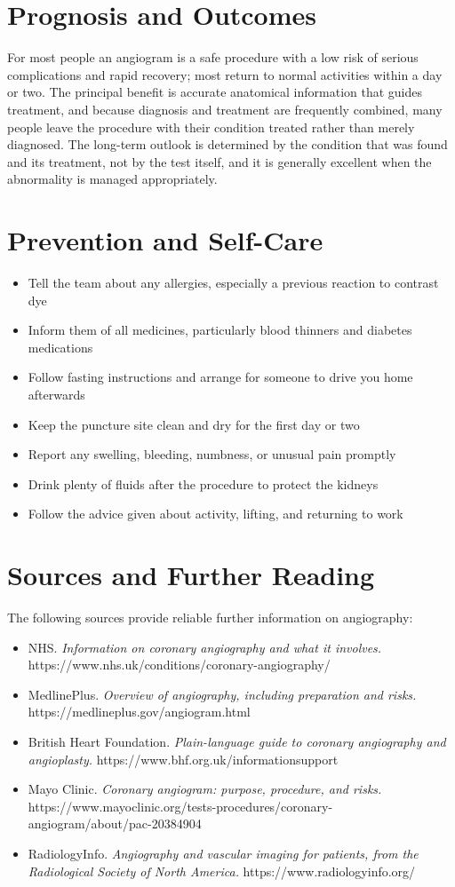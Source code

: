\section*{Prognosis and Outcomes}
For most people an angiogram is a safe procedure with a low risk of serious complications and rapid recovery; most return to normal activities within a day or two. The principal benefit is accurate anatomical information that guides treatment, and because diagnosis and treatment are frequently combined, many people leave the procedure with their condition treated rather than merely diagnosed. The long-term outlook is determined by the condition that was found and its treatment, not by the test itself, and it is generally excellent when the abnormality is managed appropriately.

\section*{Prevention and Self-Care}
\begin{itemize}
    \item Tell the team about any allergies, especially a previous reaction to contrast dye
    \item Inform them of all medicines, particularly blood thinners and diabetes medications
    \item Follow fasting instructions and arrange for someone to drive you home afterwards
    \item Keep the puncture site clean and dry for the first day or two
    \item Report any swelling, bleeding, numbness, or unusual pain promptly
    \item Drink plenty of fluids after the procedure to protect the kidneys
    \item Follow the advice given about activity, lifting, and returning to work
\end{itemize}

\section*{Sources and Further Reading}
The following sources provide reliable further information on angiography:

\begin{itemize}
    \item NHS. \textit{Information on coronary angiography and what it involves.} https://www.nhs.uk/conditions/coronary-angiography/
    \item MedlinePlus. \textit{Overview of angiography, including preparation and risks.} https://medlineplus.gov/angiogram.html
    \item British Heart Foundation. \textit{Plain-language guide to coronary angiography and angioplasty.} https://www.bhf.org.uk/informationsupport
    \item Mayo Clinic. \textit{Coronary angiogram: purpose, procedure, and risks.} https://www.mayoclinic.org/tests-procedures/coronary-angiogram/about/pac-20384904
    \item RadiologyInfo. \textit{Angiography and vascular imaging for patients, from the Radiological Society of North America.} https://www.radiologyinfo.org/
\end{itemize}
